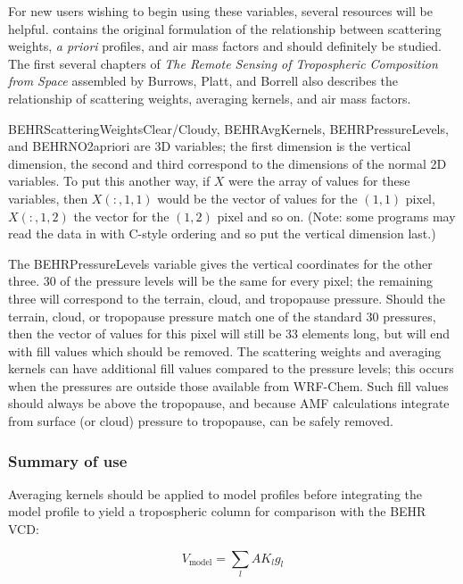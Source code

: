 \documentclass[12pt]{article}
\begin{document}
	For new users wishing to begin using these variables, several resources will be helpful. \citet{palmer2001} contains the original formulation of the relationship between scattering weights, \emph{a priori}  profiles, and air mass factors and should definitely be studied. The first several chapters of \emph{The Remote Sensing of Tropospheric Composition from Space} assembled by Burrows, Platt, and Borrell \citep{burrows-platt} also describes the relationship of scattering weights, averaging kernels, and air mass factors.
	
    BEHRScatteringWeightsClear/Cloudy, BEHRAvgKernels, BEHRPressureLevels, and BEHRNO2apriori are 3D variables; the first dimension is the vertical dimension, the second and third correspond to the dimensions of the normal 2D variables. To put this another way, if $X$ were the array of values for these variables, then $X(:,1,1)$ would be the vector of values for the $(1,1)$ pixel, $X(:,1,2)$ the vector for the $(1,2)$ pixel and so on. (Note: some programs may read the data in with C-style ordering and so put the vertical dimension last.)
	
	The BEHRPressureLevels variable gives the vertical coordinates for the other three.  30 of the pressure levels will be the same for every pixel; the remaining three will correspond to the terrain, cloud, and tropopause pressure. Should the terrain, cloud, or tropopause pressure match one of the standard 30 pressures, then the vector of values for this pixel will still be 33 elements long, but will end with fill values which should be removed.  The scattering weights and averaging kernels can have additional fill values compared to the pressure levels; this occurs when the pressures are outside those available from WRF-Chem. Such fill values should always be above the tropopause, and because AMF calculations integrate from surface (or cloud) pressure to tropopause, can be safely removed.
	
	\subsubsection{Summary of use}
	
	Averaging kernels should be applied to model profiles before integrating the model profile to yield a tropospheric column for comparison with the BEHR VCD:
	
	\begin{equation}
	V_{\mathrm{model}} = \sum_l AK_l g_l
	\end{equation}
	
\end{document}
